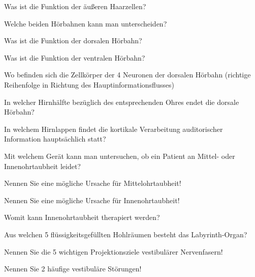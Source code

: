 \documentclass[10pt, a4paper]{exam}
\begin{document}
\begin{questions}
  \question Was ist die Funktion der äußeren Haarzellen?
  \begin{solution}
  \end{solution}
  \question Welche beiden Hörbahnen kann man unterscheiden?
  \begin{solution}
  \end{solution}
  \question Was ist die Funktion der dorsalen Hörbahn?
  \begin{solution}
  \end{solution}
  \question Was ist die Funktion der ventralen Hörbahn?
  \begin{solution}
  \end{solution}
  \question Wo befinden sich die Zellkörper der 4 Neuronen der dorsalen Hörbahn (richtige Reihenfolge in Richtung des Hauptinformationsflusses)
  \begin{solution}
  \end{solution}
  \question In welcher Hirnhälfte bezüglich des entsprechenden Ohres endet die dorsale Hörbahn?
  \begin{solution}
  \end{solution}
  \question In welchem Hirnlappen findet die kortikale Verarbeitung auditorischer Information hauptsächlich statt?
  \begin{solution}
  \end{solution}
  \question Mit welchem Gerät kann man untersuchen, ob ein Patient an Mittel- oder Innenohrtaubheit leidet?
  \begin{solution}
  \end{solution}
  \question Nennen Sie eine mögliche Ursache für Mittelohrtaubheit!
  \begin{solution}
  \end{solution}
  \question Nennen Sie eine mögliche Ursache für Innenohrtaubheit!
  \begin{solution}
  \end{solution}
  \question Womit kann Innenohrtaubheit therapiert werden?
  \begin{solution}
  \end{solution}
  \question Aus welchen 5 flüssigkeitsgefüllten Hohlräumen besteht das Labyrinth-Organ?
  \begin{solution}
  \end{solution}
  \question Nennen Sie die 5 wichtigen Projektionsziele vestibulärer Nervenfasern!
  \begin{solution}
  \end{solution}
  \question Nennen Sie 2 häufige vestibuläre Störungen!

\end{questions}
\end{document}

